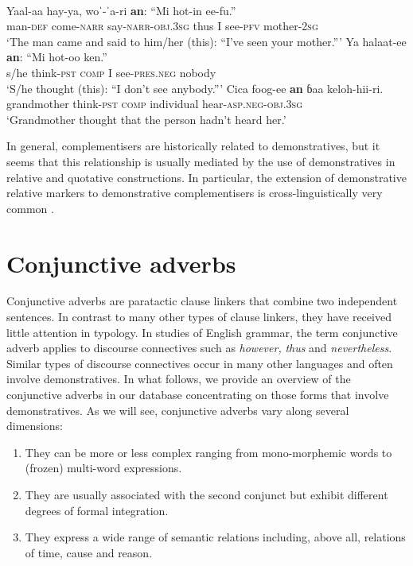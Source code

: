 \documentclass[output=paper,colorlinks,citecolor=brown]{langscibook}
\begin{document}
\ea\label{ex:diessel:24}
\\
\ea\label{ex:diessel:24a} 
\gll   Yaal-aa    hay-ya,    woˈ-ˈa-ri     \textbf{an}:  “Mi   hot-in  ee-fu.”\\
       man-\textsc{def}    come-\textsc{narr}  say-\textsc{narr-obj.3sg}   thus   {\db}I  see-\textsc{pfv}  mother-\textsc{2sg}\\
\glt ‘The man came and said to him/her (this): “I’ve seen your mother.”’
\ex\label{ex:diessel:24b}
\gll   Ya  halaat-ee  \textbf{an}:  “Mi   hot-oo     ken.”\\
       s/he  think-\textsc{pst}  \textsc{comp}   {\db}I   see-\textsc{pres.neg}   nobody\\
\glt   ‘S/he thought (this): “I don’t see anybody.”’
\ex\label{ex:diessel:24c}
\gll   Cica     foog-ee   \textbf{an}  ɓaa   keloh-hii-ri.\\
       grandmother   think-\textsc{pst} \textsc{comp}  individual hear-\textsc{asp.neg-obj.3sg}\\
\glt   ‘Grandmother thought that the person hadn’t heard her.’
\z
\z

In general, complementisers are historically related to demonstratives, but it seems that this relationship is usually mediated by the use of demonstratives in relative and quotative constructions. In particular, the extension of demonstrative relative markers to demonstrative complementisers is cross-linguistically very common \citep[248-254]{SchmidtkeBode2014}. 

\section{Conjunctive adverbs}\label{sec:diessel:6}

Conjunctive adverbs are paratactic clause linkers that combine two independent sentences. In contrast to many other types of clause linkers, they have received little attention in typology. In studies of English grammar, the term conjunctive adverb applies to discourse connectives such as \textit{however,} \textit{thus} and \textit{nevertheless}. Similar types of discourse connectives occur in many other languages and often involve demonstratives. In what follows, we provide an overview of the conjunctive adverbs in our database concentrating on those forms that involve demonstratives. As we will see, conjunctive adverbs vary along several dimensions:

\begin{enumerate}
\item They can be more or less complex ranging from mono-morphemic words to (frozen) multi-word expressions.
\item They are usually associated with the second conjunct but exhibit different degrees of formal integration.
\item They express a wide range of semantic relations including, above all, relations of time, cause and reason.
\end{enumerate}
\end{document}
